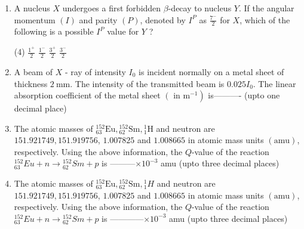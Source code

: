 \begin{enumerate}
\begin{tasks}
		\task[\textbf{c.}]Not allowed by Fermi but allowed by Gamow-Teller selection rule
		\task[\textbf{d.}] Not allowed both by Fermi and Gamow-Teller selection rule
	\end{tasks}
\item  A nucleus $X$ undergoes a first forbidden $\beta$-decay to nucleus $Y$. If the angular momentum $(I)$ and parity $(P)$, denoted by $I^P$ as $\frac{7^{-}}{2}$ for $X$, which of the following is a possible $I^P$ value for $Y$ ?
{}
	 \begin{tasks}(4)
		\task[\textbf{a.}]$\frac{1^{+}}{2}$
		\task[\textbf{b.}]$\frac{1^{-}}{2}$
		\task[\textbf{c.}]$\frac{3^{+}}{2}$
		\task[\textbf{d.}]$\frac{3^{-}}{2}$ 
	\end{tasks}
	\item A beam of $X$ - ray of intensity $I_0$ is incident normally on a metal sheet of thickness $2 \mathrm{~mm}$. The intensity of the transmitted beam is $0.025 I_0$. The linear absorption coefficient of the metal sheet $\left(\right.$ in $\left.\mathrm{m}^{-1}\right)$ is---------- (upto one decimal place)
	{}
	\item The atomic masses of ${ }_{63}^{152} \mathrm{Eu},{ }_{62}^{152} \mathrm{Sm},{ }_1^1 \mathrm{H}$ and neutron are $151.921749,151.919756$, $1.007825$ and $1.008665$ in atomic mass units $(\mathrm{amu})$, respectively. Using the above information, the $Q$-value of the reaction ${ }_{63}^{152} E u+n \rightarrow{ }_{62}^{152} S m+p$ is ---------$\times 10^{-3}$ amu (upto three decimal places)
	{}
	\item The atomic masses of ${ }_{63}^{152} \mathrm{Eu},{ }_{62}^{152} \mathrm{Sm},{ }_1^1 H$ and neutron are $151.921749,151.919756$, $1.007825$ and $1.008665$ in atomic mass units $(\mathrm{amu})$, respectively. Using the above information, the $Q$-value of the reaction ${ }_{63}^{152} E u+n \rightarrow{ }_{62}^{152} S m+p$ is ------------$\times 10^{-3}$ amu (upto three decimal places)
	{}
\end{enumerate}
\setlength\arrayrulewidth{1pt}
